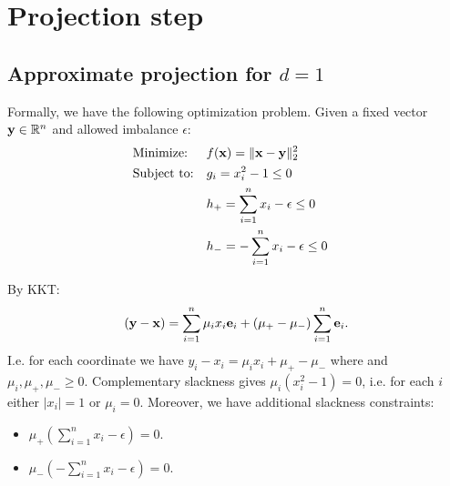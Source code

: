 \section{Projection step}\label{sec:projection}

\subsection{Approximate projection for $d = 1$}

Formally, we have the following optimization problem. Given a fixed vector $\mathbf y \in \mathbb R^n$ and allowed imbalance $\epsilon$:
\begin{align*}
& \text{Minimize:} && f(\mathbf x) = \|\mathbf x - \mathbf y\|_2^2&& \\ 
& \text{Subject to:} && g_i = x_i^2 - 1 \le 0 &&\\
&&& h_+ = \sum_{i = 1}^n x_i - \epsilon \le 0 && \\
&&& h_- = -\sum_{i = 1}^n x_i - \epsilon \le 0 && \\
\end{align*}

By KKT:
$$(\mathbf y - \mathbf x) = \sum_{i = 1}^n \mu_i x_i \mathbf e_i + (\mu_+ - \mu_-) \sum_{i = 1}^n \mathbf e_i.$$
I.e. for each coordinate we have $y_i - x_i = \mu_i x_i + \mu_+ - \mu_-$ where and $\mu_i, \mu_+, \mu_- \ge 0$.
Complementary slackness gives $\mu_i (x_i^2 -1) = 0$, i.e. for each $i$ either $|x_i| = 1$ or $\mu_i = 0$.
Moreover, we have additional slackness constraints:
\begin{itemize}
	\item $\mu_+ (\sum_{i = 1}^n x_i - \epsilon) = 0$.
	\item $\mu_- (-\sum_{i = 1}^n x_i - \epsilon) = 0$.
\end{itemize}

